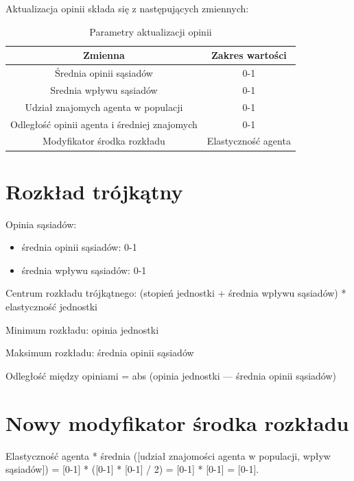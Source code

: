 \documentclass{wfiisul}
\begin{document}
Aktualizacja opinii składa się z następujących zmiennych:

\begin{table}[htbp]
  \centering
  \begin{tabular}{c|c}
    \hline
    Zmienna                                      & Zakres wartości     \\
    \hline
    Średnia opinii sąsiadów                      & 0-1                 \\
    Srednia wpływu sąsiadów                      & 0-1                 \\
    Udział znajomych agenta w populacji          & 0-1                 \\
    Odległość opinii agenta i średniej znajomych & 0-1                 \\
    Modyfikator środka rozkładu                  & Elastyczność agenta \\%
  \end{tabular}
  \caption{Parametry aktualizacji opinii}
  \label{tab:opinion_update_parameters}
\end{table}

\section{Rozkład trójkątny}

Opinia sąsiadów:
\begin{itemize}
  \item średnia opinii sąsiadów: 0-1
  \item średnia wpływu sąsiadów: 0-1
\end{itemize}

Centrum rozkładu trójkątnego: (stopień jednostki + średnia wpływu sąsiadów) * elastyczność jednostki

Minimum rozkładu: opinia jednostki

Maksimum rozkładu: średnia opinii sąsiadów

Odległość między opiniami = abs (opinia jednostki — średnia opinii sąsiadów)

\section{Nowy modyfikator środka rozkładu}

Elastyczność agenta * średnia ([udział znajomości agenta w populacji, wpływ sąsiadów]) = [0-1] * ([0-1] * [0-1] / 2) = [0-1] * [0-1] = [0-1].
\end{document}
